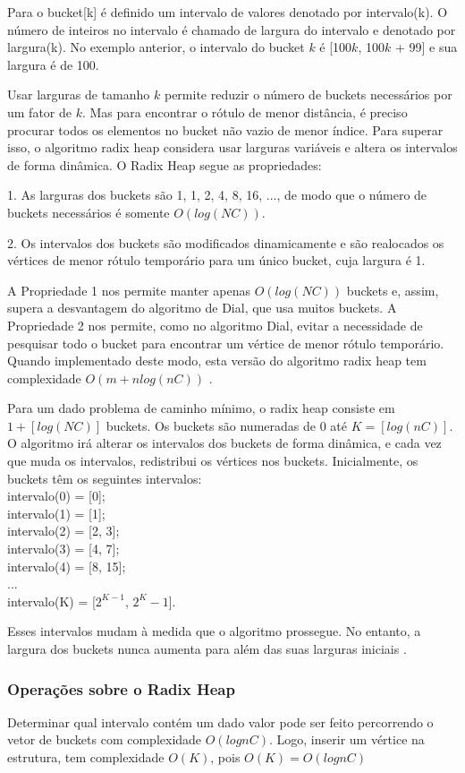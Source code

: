 Para o bucket[k] é definido um intervalo de valores denotado por intervalo(k). O número de inteiros
no intervalo é chamado de largura do intervalo e denotado por largura(k).
No exemplo anterior, o intervalo do bucket $k$ é [100$k$, 100$k$ + 99] e sua largura é de 100. 

Usar larguras de tamanho $k$ permite reduzir o número de buckets necessários por um fator de $k$.
Mas para encontrar o rótulo de menor distância, é preciso procurar todos os elementos no bucket não vazio de menor índice.
Para superar isso, o algoritmo radix heap considera usar larguras variáveis e altera os intervalos de forma dinâmica. 
O Radix Heap segue as propriedades:

1. As larguras dos buckets são 1, 1, 2, 4, 8, 16, ..., de modo que o número de buckets necessários é somente $O(log(NC))$.

2.  Os intervalos dos buckets são modificados dinamicamente e são realocados os vértices de menor rótulo temporário
para um único bucket, cuja largura é 1.

A Propriedade 1 nos permite manter apenas $O(log(NC))$ buckets e, assim, supera a desvantagem do algoritmo
de Dial, que usa muitos buckets.
A Propriedade 2 nos permite, como no algoritmo Dial, evitar a necessidade de 
pesquisar todo o bucket para encontrar um vértice de menor rótulo temporário. Quando implementado deste modo, esta 
versão do algoritmo radix heap tem complexidade $O(m + nlog(nC))$ \cite{bookahuja}.

Para um dado problema de caminho mínimo, o radix heap consiste em $1 + [log(NC)]$ buckets.
Os buckets são numeradas de $0$ até $K = [log(nC)]$.
O algoritmo irá alterar os intervalos dos buckets de forma dinâmica, e cada vez que muda os intervalos,
redistribui os vértices nos buckets. Inicialmente, os buckets têm os seguintes intervalos:\\
intervalo(0) = [0];\\
intervalo(1) = [1];\\
intervalo(2) = [2, 3];\\
intervalo(3) = [4, 7];\\
intervalo(4) = [8, 15];\\
...\\
intervalo(K) = [$2^{K - 1}$, $2^K - 1$].

Esses intervalos mudam à medida que o algoritmo prossegue. No entanto, a largura dos buckets nunca aumenta
para além das suas larguras iniciais \cite{bookahuja}.

\subsubsection{Operações sobre o Radix Heap}
Determinar qual intervalo contém um dado valor pode ser feito percorrendo o vetor de buckets com complexidade $O(lognC)$.
Logo, inserir um vértice na estrutura, tem complexidade $O(K)$, pois $O(K) = O(lognC)$


